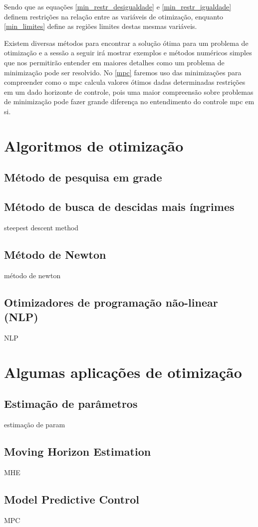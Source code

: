 Sendo que as equações \ref{min_restr_desigualdade} e \ref{min_restr_igualdade} definem restrições na relação entre as variáveis de otimização, enquanto \ref{min_limites} define as regiões limites destas mesmas variáveis.

Existem diversas métodos para encontrar a solução ótima para um problema de otimização e a sessão a seguir irá mostrar exemplos e métodos numéricos simples que nos permitirão entender em maiores detalhes como um problema de minimização pode ser resolvido. No \autoref{mpc} faremos uso das minimizações para compreender como o \acrshort{mpc} calcula valores ótimos dadas determinadas restrições em um dado horizonte de controle, pois uma maior compreensão sobre problemas de minimização pode fazer grande diferença no entendimento do controle \acrshort{mpc} em si.

\section{Algoritmos de otimização}

\subsection{Método de pesquisa em grade}




\subsection{Método de busca de descidas mais íngrimes}

steepest descent method

\subsection{Método de Newton}

método de newton

\subsection{Otimizadores de programação não-linear (NLP)}

NLP

\section{Algumas aplicações de otimização}

\subsection{Estimação de parâmetros}

estimação de param

\subsection{Moving Horizon Estimation}

MHE

\subsection{Model Predictive Control}

MPC